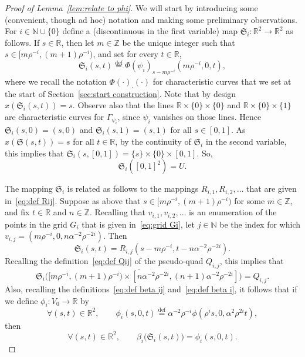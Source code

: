 \documentclass[11pt,reqno]{amsart}
\newcommand{\N}{\mathbb{N}}
\newcommand{\R}{\mathbb{R}}
\newcommand{\Z}{\mathbb{Z}}
\newcommand{\0}{\mathbf{0}}
\renewcommand{\1}{\mathbf 1}
\newcommand{\from}{\colon}
\newcommand{\eqdef}{\stackrel{\mathrm{def}}{=}}
\theoremstyle{remark}
\begin{document}
\begin{proof}[Proof of Lemma~\ref{lem:relate to phi}] We will start by introducing some (convenient, though ad hoc) notation and making some preliminary observations. For $i\in \N\cup \{0\}$ define a (discontinuous in the first variable) map $\mathfrak{S}_i\from \R^2\to \R^2$ as follows. If $s\in \R$, then  let $m\in \Z$ be the unique integer such that $s\in [m\rho^{-i},(m+1)\rho^{-i})$, and set for every $t\in \R$,
$$
\mathfrak{S}_i(s,t)\eqdef \Phi(\psi_i)_{s-m\rho^{-i}}(m\rho^{-i},0,t),
$$
where we recall the notation $\Phi(\cdot)_\cdot(\cdot)$ for characteristic curves that we set at the start of Section~\ref{sec:start construction}. Note that by design $x(\mathfrak{S}_i(s,t))=s$. Observe also that the lines $\R\times \{0\}\times \{0\}$ and $\R\times \{0\}\times \{1\}$ are characteristic curves for $\Gamma_{\psi_i}$, since  $\psi_i$ vanishes on those lines. Hence $\mathfrak{S}_i(s,0)=(s,0)$ and $\mathfrak{S}_i(s,1)=(s,1)$ for all $s\in [0,1]$. As $x(\mathfrak{S}(s,t))=s$ for all $t\in \R$, by the continuity of $\mathfrak{S}_i$ in the second variable, this implies that $\mathfrak{S}_i(s,[0,1])=\{s\}\times\{0\}\times [0,1]$. So,
\begin{equation}\label{eqLsquare to square}
\mathfrak{S}_i([0,1]^2)=U.
\end{equation}

The mapping $\mathfrak{S}_i$ is related  as follows to  the mappings $R_{i,1},R_{i,2},\ldots$ that are given in~\eqref{eq:def Rij}. Suppose as above  that $s\in [m\rho^{-i},(m+1)\rho^{-i})$ for some $m\in \Z$, and fix $t\in \R$ and $n\in \Z$. Recalling that $v_{i,1},v_{i,2},\ldots$ is an enumeration of the points in the grid $G_i$ that is given in~\eqref{eq:grid Gi}, let  $j\in \N$ be the index for which  $v_{i,j}=(m\rho^{-i},0,n\alpha^{-2}\rho^{-2i})$. Then
$$
\mathfrak{S}_i(s,t)=R_{i,j}(s-m\rho^{-i},t-n\alpha^{-2}\rho^{-2i}).
$$
Recalling the definition~\eqref{eq:def Qij} of the pseudo-quad $Q_{i,j}$, this implies that
$$
\overline{\mathfrak{S}_i\big([m\rho^{-i},(m+1)\rho^{-i})\times [n\alpha^{-2}\rho^{-2i},(n+1)\alpha^{-2}\rho^{-2i}]\big)}=Q_{i,j}.
$$
Also, recalling the definitions~\eqref{eq:def beta ij} and~\eqref{eq:def beta i},  it follows that if we define $\phi_i\from V_0\to \R$ by
\begin{equation}\label{eq:rescaled phi}
\forall  (s,t)\in \R^2,\qquad \phi_i(s,0,t)\eqdef \alpha^{-2}\rho^{-i}\phi(\rho^is,0,\alpha^2\rho^{2i}t),
\end{equation}
then
\begin{equation}\label{eq:slab flow}
\forall  (s,t)\in \R^2,\qquad \beta_i\big(\mathfrak{S}_i(s,t)\big)=\phi_i(s,0,t).
\end{equation}




\end{proof}
\end{document}
